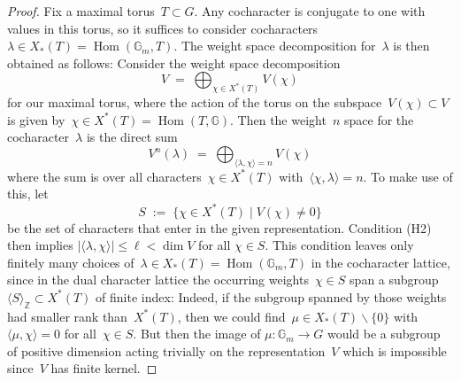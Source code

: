 \documentclass[10pt,a4paper]{amsart}
\DeclareMathOperator{\Hom}{Hom}
\newcommand{\bbG}{\mathbb{G}}
\newcommand{\bbZ}{\mathbb{Z}}
\renewcommand{\le}{\leqslant}
\begin{document}
\begin{proof} 
Fix a maximal torus~$T\subset G$. Any cocharacter is conjugate to one with values in this torus, so it suffices to consider cocharacters~$\lambda \in X_\ast(T) = \Hom(\bbG_m, T)$. The weight space decomposition for~$\lambda$ is then obtained as follows: Consider the weight space decomposition
%
\[
 V \;=\; \bigoplus_{\chi \in X^\ast(T)} V(\chi)
\]
%
for our maximal torus, where the action of the torus on the subspace~$V(\chi)\subset V$ is given by~$\chi \in X^\ast(T)=\Hom(T, \bbG)$. Then the weight~$n$ space for the cocharacter~$\lambda$ is the direct sum
%
\[
 V^n(\lambda) \;=\; \bigoplus_{\langle \lambda, \chi \rangle = n} V(\chi)
\]
%
where the sum is over all characters~$\chi \in X^\ast(T)$ with~$\langle \chi, \lambda \rangle = n$. To make use of this, let
%
\[
 S \;:=\; \{ \chi \in X^\ast(T) \mid V(\chi) \ne 0\}
\]
%
be the set of characters that enter in the given representation. Condition (H2) then implies
%
$|\langle \lambda, \chi \rangle| \le \ell < \dim V$
for all $\chi \in S$.
%
This condition leaves only finitely many choices of~$\lambda \in X_\ast(T)=\Hom(\bbG_m, T)$ in the cocharacter lattice, since in the dual character lattice the occurring weights~$\chi \in S$ span a subgroup
%
$
 \langle S \rangle_\bbZ \subset X^\ast(T)
$
%
of finite index: Indeed, if the subgroup spanned by those weights had smaller rank than~$X^\ast(T)$, then we could find~$\mu\in X_\ast(T)\smallsetminus \{0\}$ with~$\langle \mu, \chi\rangle = 0$ for all~$\chi \in S$. But then the image of
%
$
 \mu\colon \bbG_m \to G
$
%
would be a subgroup of positive dimension acting trivially on the representation~$V$ which is impossible since~$V$ has finite kernel.
\end{proof}
\end{document}

